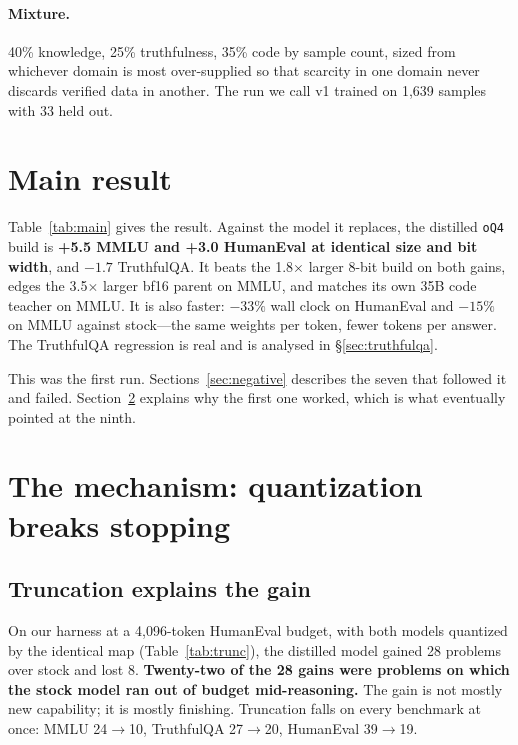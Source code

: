 \documentclass[11pt]{article}
\newcommand{\oQ}{\texttt{oQ4}}
\begin{document}
\paragraph{Mixture.}
40\% knowledge, 25\% truthfulness, 35\% code by sample count, sized from
whichever domain is most over-supplied so that scarcity in one domain never
discards verified data in another.  The run we call v1 trained on 1{,}639
samples with 33 held out.

\section{Main result}
\label{sec:main}



Table~\ref{tab:main} gives the result.  Against the model it replaces, the
distilled \oQ{} build is \textbf{+5.5 MMLU and +3.0 HumanEval at identical size
and bit width}, and $-1.7$ TruthfulQA.  It beats the 1.8$\times$ larger 8-bit
build on both gains, edges the 3.5$\times$ larger bf16 parent on MMLU, and
matches its own 35B code teacher on MMLU.  It is also faster: $-33\%$ wall clock
on HumanEval and $-15\%$ on MMLU against stock---the same weights per token,
fewer tokens per answer.  The TruthfulQA regression is real and is analysed in
\S\ref{sec:truthfulqa}.

This was the first run.  Sections~\ref{sec:negative} describes the seven that
followed it and failed.  Section~\ref{sec:mechanism} explains why the first one
worked, which is what eventually pointed at the ninth.

\section{The mechanism: quantization breaks stopping}
\label{sec:mechanism}

\subsection{Truncation explains the gain}

On our harness at a 4{,}096-token HumanEval budget, with both models quantized
by the identical map (Table~\ref{tab:trunc}), the distilled model gained 28
problems over stock and lost 8.  \textbf{Twenty-two of the 28 gains were
problems on which the stock model ran out of budget mid-reasoning.}  The gain is
not mostly new capability; it is mostly finishing.  Truncation falls on every
benchmark at once: MMLU 24$\to$10, TruthfulQA 27$\to$20, HumanEval 39$\to$19.
\end{document}
